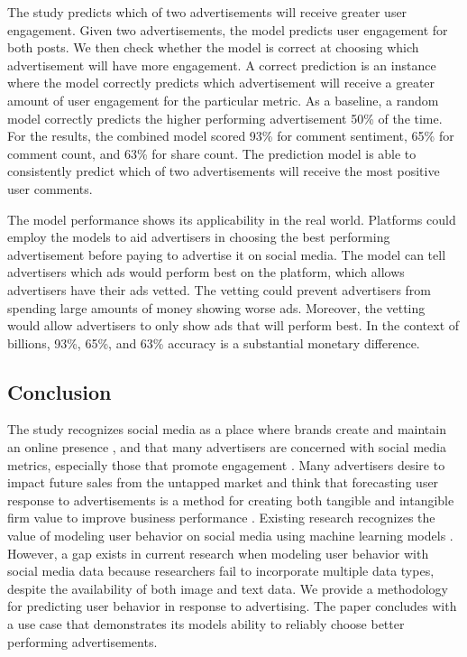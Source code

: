 \documentclass[mksc,blindrev]{informs3} %
\begin{document}
The study predicts which of two advertisements will receive greater user engagement. Given two advertisements, the model predicts user engagement for both posts. We then check whether the model is correct at choosing which advertisement will have more engagement. A correct prediction is an instance where the model correctly predicts which advertisement will receive a greater amount of user engagement for the particular metric. As a baseline, a random model correctly predicts the higher performing advertisement 50\% of the time.  For the results, the combined model scored 93\% for comment sentiment, 65\% for comment count, and 63\% for share count. The prediction model is able to consistently predict which of two advertisements will receive the most positive user comments.

The model performance shows its applicability in the real world.  Platforms could employ the models to aid advertisers in choosing the best performing advertisement before paying to advertise it on social media. The model can tell advertisers which ads would perform best on the platform, which allows advertisers have their ads vetted. The vetting could prevent advertisers from spending large amounts of money showing worse ads. Moreover, the vetting would allow advertisers to only show ads that will perform best. In the context of billions, 93\%, 65\%, and 63\% accuracy is a substantial monetary difference.

\subsection{Conclusion}

The study recognizes social media as a place where brands create and maintain an online presence \cite{Greenwood2016}, and that many advertisers are concerned with social media metrics, especially those that promote engagement \cite{Tiago2014}. Many advertisers desire to impact future sales from the untapped market \cite{Guo2020} and think that forecasting user response to advertisements is a method for creating both tangible and intangible firm value to improve business performance \cite{Authors2013}. Existing research recognizes the value of modeling user behavior on social media using machine learning models \cite{Li2015, 8029313, Ohsawa2013, Liu2012, Li2015}. However, a gap exists in current research when modeling user behavior with social media data because researchers fail to incorporate multiple data types, despite the availability of both image and text data. We provide a methodology for predicting user behavior in response to advertising. The paper concludes with a use case that demonstrates its models ability to reliably choose better performing advertisements.
\end{document}

